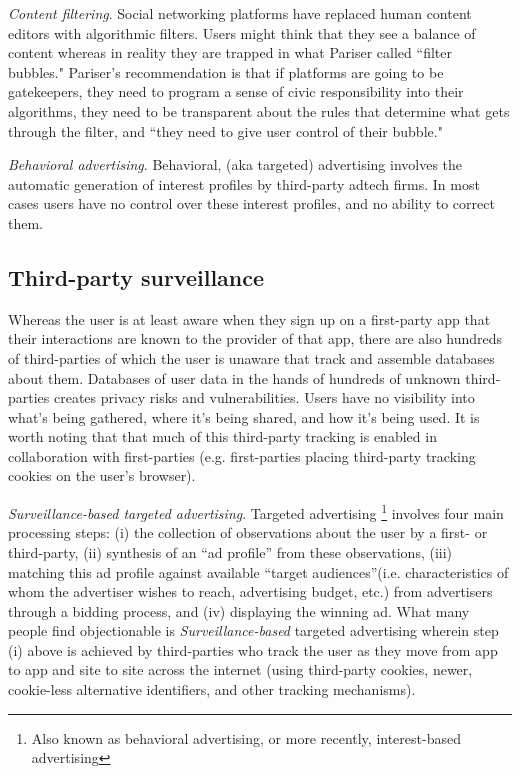 \documentclass[11pt, oneside]{article}   	%
\begin{document}
\emph{Content filtering}. Social networking platforms have replaced human content editors with algorithmic filters. Users might think that they see a balance of content whereas in reality they are trapped in what Pariser called ``filter bubbles."\cite{Pariser2011} Pariser's recommendation is that if platforms are going to be gatekeepers, they need to program a sense of civic responsibility into their algorithms, they need to be transparent about the rules that determine what gets through the filter, and ``they need to give user control of their bubble."\cite[p66]{McNamee2020}

\emph{Behavioral advertising}. Behavioral, (aka targeted) advertising involves the automatic generation of interest profiles by third-party adtech firms. In most cases users have no control over these interest profiles, and no ability to correct them.

\subsection{Third-party surveillance}

Whereas the user is at least aware when they sign up on a first-party app that their interactions are known to the provider of that app, there are also hundreds of third-parties of which the user is unaware that track and assemble databases about them. Databases of user data in the hands of hundreds of unknown third-parties creates privacy risks and vulnerabilities. Users have no visibility into what's being gathered, where it's being shared, and how it's being used. It is worth noting that that much of this third-party tracking is enabled in collaboration with first-parties (e.g. first-parties placing third-party tracking cookies on the user's browser).

\emph{Surveillance-based targeted advertising}. Targeted advertising \footnote{Also known as behavioral advertising, or more recently, interest-based advertising} involves four main processing steps: (i) the collection of observations about the user by a first- or third-party, (ii) synthesis of an ``ad profile” from these observations, (iii) matching this ad profile against available ``target audiences”(i.e. characteristics of whom the advertiser wishes to reach, advertising budget, etc.) from advertisers through a bidding process, and (iv) displaying the winning ad. What many people find objectionable is \emph{Surveillance-based} targeted advertising wherein step (i) above is achieved by third-parties who track the user as they move from app to app and site to site across the internet (using third-party cookies, newer, cookie-less alternative identifiers, and other tracking mechanisms). 
\end{document}
